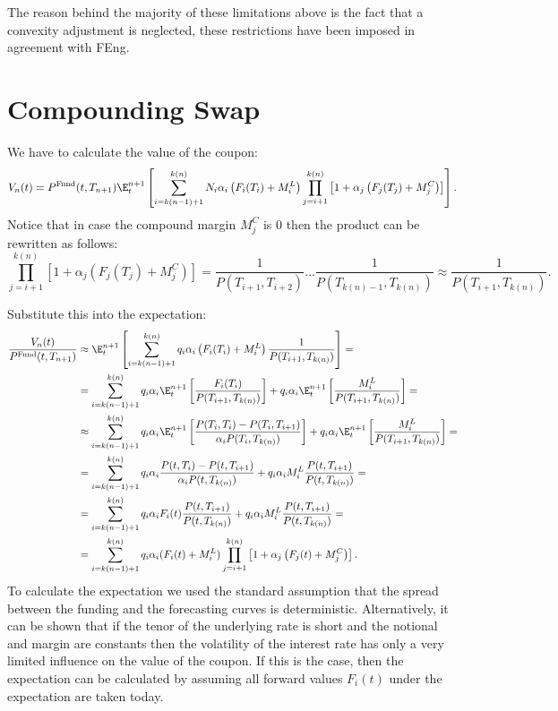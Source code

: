 \documentclass[]{pmv_report} %
\begin{document}
 The reason behind the majority of these limitations above is the fact that a convexity adjustment is neglected, these restrictions have been imposed in agreement with FEng.


\section{Compounding Swap}
\label{sec:Comp}
We have to calculate the value of the coupon:
\begin{equation*}
  V_n(t)=P^{\text{Fund}}(t,T_{n+1})\E_t^{n+1}
  \left[
  \sum_{i=k(n-1)+1}^{k(n)} N_i \alpha_i \left( F_i(T_i)+M_i^L \right)
  \prod_{j=i+1}^{k(n)} \left[ 1+\alpha_j \left( F_j(T_j)+M_j^C \right) \right]
  \right].
\end{equation*}
Notice that in case the compound margin $M_j^C$ is $0$ then the product can be rewritten as follows:
\begin{equation*}
  \prod_{j=i+1}^{k(n)} \left[ 1+\alpha_j \left( F_j(T_j)+M_j^C \right) \right] =
  \frac{1}{P(T_{i+1},T_{i+2})}\hdots \frac{1}{P(T_{k(n)-1},T_{k(n)})} \approx\frac{1}{P(T_{i+1},T_{k(n)})}.
\end{equation*}

Substitute this into the expectation:
\begin{align*}
  \frac{V_n(t)}{P^{\text{Fund}}(t,T_{n+1})}& \approx \E_t^{n+1}
  \left[
  \sum_{i=k(n-1)+1}^{k(n)} q_i \alpha_i \left( F_i(T_i)+M_i^L \right)
  \frac{1}{P(T_{i+1},T_{k(n)})}
  \right]=\\
  &=
  \sum_{i=k(n-1)+1}^{k(n)} q_i \alpha_i \E_t^{n+1}
  \left[ \frac{F_i(T_i)}{P(T_{i+1},T_{k(n)})}\right]
  + q_i \alpha_i \E_t^{n+1}\left[\frac{M_i^L}{P(T_{i+1},T_{k(n)})} \right]=\\
  & \approx \sum_{i=k(n-1)+1}^{k(n)} q_i \alpha_i \E_t^{n+1}
  \left[\frac{P(T_i,T_{i})-P(T_i,T_{i+1})}{\alpha_i P(T_{i},T_{k(n)})}\right]
  + q_i \alpha_i \E_t^{n+1}\left[\frac{M_i^L}{P(T_{i+1},T_{k(n)})} \right]=\\
  &=
  \sum_{i=k(n-1)+1}^{k(n)} q_i \alpha_i
  \frac{P(t,T_{i})-P(t,T_{i+1})}{\alpha_i P(t,T_{k(n)})}
  + q_i \alpha_i M_i^L \frac{P(t,T_{i+1})}{P(t,T_{k(n)})} =\\
  &=\sum_{i=k(n-1)+1}^{k(n)} q_i \alpha_i
  F_i(t)\frac{P(t,T_{i+1})}{ P(t,T_{k(n)})}
  + q_i \alpha_i M_i^L \frac{P(t,T_{i+1})}{P(t,T_{k(n)})}=\\
  &=\sum_{i=k(n-1)+1}^{k(n)} q_i \alpha_i (F_i(t)+M_i^L) \prod_{j=i+1}^{k(n)} \left[ 1+\alpha_j \left( F_j(t)+M_j^C \right) \right].
\end{align*}
To calculate the expectation we used the standard assumption that the spread between the funding and the forecasting curves is deterministic.
Alternatively, it can be shown that if the tenor of the underlying rate is short and the notional and margin are constants then the volatility of the interest rate has only a very limited influence on the value of the coupon.
If this is the case, then the expectation can be calculated by assuming all forward values $F_i(t)$ under the expectation are taken today.
\end{document}
